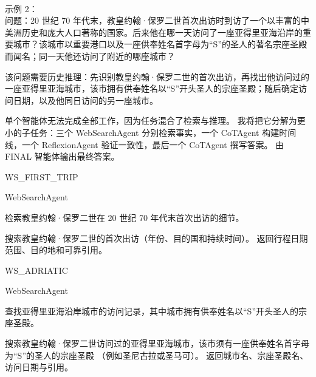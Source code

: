 \begin{userprompt}[title={用户提示词}]
\\


示例 2：\\

问题：20 世纪 70 年代末，教皇约翰·保罗二世首次出访时到访了一个以丰富的中美洲历史和庞大人口著称的国家。后来他在哪一天访问了一座亚得里亚海沿岸的重要城市？该城市以重要港口以及一座供奉姓名首字母为“S”的圣人的著名宗座圣殿而闻名；同一天他还访问了附近的哪座城市？\\



该问题需要历史推理：先识别教皇约翰·保罗二世的首次出访，再找出他访问过的一座亚得里亚海城市，该市拥有供奉姓名以“S”开头圣人的宗座圣殿；随后确定访问日期，以及他同日访问的另一座城市。

单个智能体无法完成全部工作，因为任务混合了检索与推理。
我将把它分解为更小的子任务：三个 WebSearchAgent 分别检索事实，一个 CoTAgent 构建时间线，一个 ReflexionAgent 验证一致性，最后一个 CoTAgent 撰写答案。
由 FINAL 智能体输出最终答案。



\quad{}WS\_FIRST\_TRIP

\quad{}WebSearchAgent

\quad{}
检索教皇约翰·保罗二世在 20 世纪 70 年代末首次出访的细节。

\quad{}

\qquad{}
搜索教皇约翰·保罗二世的首次出访（年份、目的国和持续时间）。
返回行程日期范围、目的地和可靠引用。

\quad{}



\quad{}WS\_ADRIATIC

\quad{}WebSearchAgent

\quad{}
查找亚得里亚海沿岸城市的访问记录，其中城市拥有供奉姓名以“S”开头圣人的宗座圣殿。

\quad{}

\qquad{}
搜索教皇约翰·保罗二世访问过的亚得里亚海城市，该市须有一座供奉姓名首字母为“S”的圣人的宗座圣殿
（例如圣尼古拉或圣马可）。
返回城市名、宗座圣殿名、访问日期与引用。


\end{userprompt}
